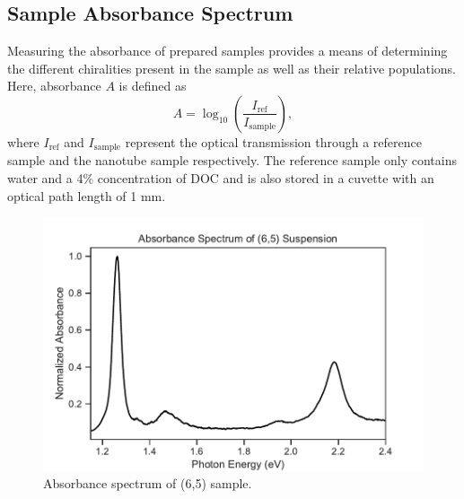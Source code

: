 \subsection{Sample Absorbance Spectrum}

Measuring the absorbance of prepared samples provides a means of determining the different chiralities present in the sample as well as their relative populations. Here, absorbance $A$ is defined as 
\begin{equation}
A = \log_{10}\left(\dfrac{I_{\mathrm{ref}}}{I_{\mathrm{sample}}}\right),
\end{equation}
where $I_{\mathrm{ref}}$ and $I_{\mathrm{sample}}$ represent the optical transmission through a reference sample and the nanotube sample respectively. The reference sample only contains water and a 4\% concentration of DOC and is also stored in a cuvette with an optical path length of 1 mm. 


\begin{figure}[H]
	\centering
	\includegraphics[scale=0.7]{images/chapter_methods/sample_absorbance}
	\caption{ Absorbance spectrum of (6,5) sample.}
	\label{fig:sample_absorbance}
\end{figure}

